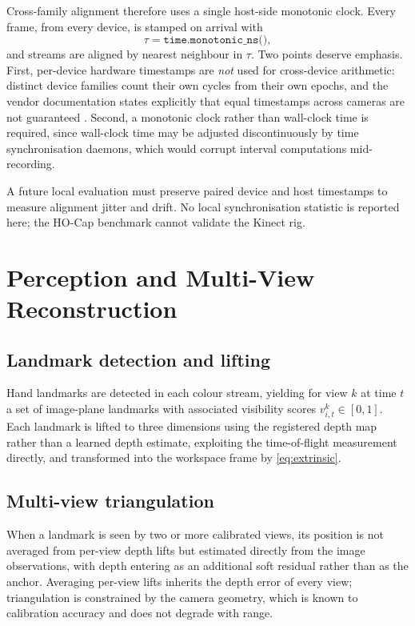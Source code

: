 Cross-family alignment therefore uses a single host-side monotonic clock. Every
frame, from every device, is stamped on arrival with
\begin{equation}
  \tau = \texttt{time.monotonic\_ns()},
  \label{eq:hostclock}
\end{equation}
and streams are aligned by nearest neighbour in $\tau$. Two points deserve
emphasis. First, per-device hardware timestamps are \emph{not} used for
cross-device arithmetic: distinct device families count their own cycles from
their own epochs, and the vendor documentation states explicitly that equal
timestamps across cameras are not guaranteed \cite{mskinect}. Second, a
monotonic clock rather than wall-clock time is required, since wall-clock time
may be adjusted discontinuously by time synchronisation daemons, which would
corrupt interval computations mid-recording.

A future local evaluation must preserve paired device and host timestamps to
measure alignment jitter and drift. No local synchronisation statistic is
reported here; the HO-Cap benchmark cannot validate the Kinect rig.

\section{Perception and Multi-View Reconstruction}
\label{sec:fusion}

\subsection{Landmark detection and lifting}

Hand landmarks are detected in each colour stream, yielding for view $k$ at
time $t$ a set of image-plane landmarks with associated visibility scores
$v^{k}_{i,t} \in [0,1]$. Each landmark is lifted to three dimensions using the
registered depth map rather than a learned depth estimate, exploiting the
time-of-flight measurement directly, and transformed into the workspace frame
by \eqref{eq:extrinsic}.

\subsection{Multi-view triangulation}

When a landmark is seen by two or more calibrated views, its position is not
averaged from per-view depth lifts but estimated directly from the image
observations, with depth entering as an additional soft residual rather than as
the anchor. Averaging per-view lifts inherits the depth error of every view;
triangulation is constrained by the camera geometry, which is known to
calibration accuracy and does not degrade with range.

